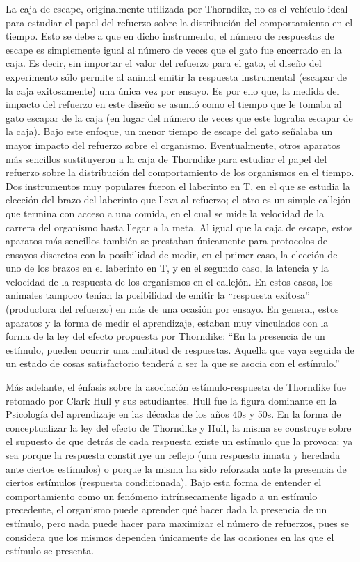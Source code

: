 \documentclass[
  letterpaper,
]{book}
\begin{document}
La caja de escape, originalmente utilizada por Thorndike, no es el
vehículo ideal para estudiar el papel del refuerzo sobre la distribución
del comportamiento en el tiempo. Esto se debe a que en dicho
instrumento, el número de respuestas de escape es simplemente igual al
número de veces que el gato fue encerrado en la caja. Es decir, sin
importar el valor del refuerzo para el gato, el diseño del experimento
sólo permite al animal emitir la respuesta instrumental (escapar de la
caja exitosamente) una única vez por ensayo. Es por ello que, la medida
del impacto del refuerzo en este diseño se asumió como el tiempo que le
tomaba al gato escapar de la caja (en lugar del número de veces que este
lograba escapar de la caja). Bajo este enfoque, un menor tiempo de
escape del gato señalaba un mayor impacto del refuerzo sobre el
organismo. Eventualmente, otros aparatos más sencillos sustituyeron a la
caja de Thorndike para estudiar el papel del refuerzo sobre la
distribución del comportamiento de los organismos en el tiempo. Dos
instrumentos muy populares fueron el laberinto en T, en el que se
estudia la elección del brazo del laberinto que lleva al refuerzo; el
otro es un simple callejón que termina con acceso a una comida, en el
cual se mide la velocidad de la carrera del organismo hasta llegar a la
meta. Al igual que la caja de escape, estos aparatos más sencillos
también se prestaban únicamente para protocolos de ensayos discretos con
la posibilidad de medir, en el primer caso, la elección de uno de los
brazos en el laberinto en T, y en el segundo caso, la latencia y la
velocidad de la respuesta de los organismos en el callejón. En estos
casos, los animales tampoco tenían la posibilidad de emitir la
``respuesta exitosa'' (productora del refuerzo) en más de una ocasión
por ensayo. En general, estos aparatos y la forma de medir el
aprendizaje, estaban muy vinculados con la forma de la ley del efecto
propuesta por Thorndike: ``En la presencia de un estímulo, pueden
ocurrir una multitud de respuestas. Aquella que vaya seguida de un
estado de cosas satisfactorio tenderá a ser la que se asocia con el
estímulo.''

Más adelante, el énfasis sobre la asociación estímulo-respuesta de
Thorndike fue retomado por Clark Hull y sus estudiantes. Hull fue la
figura dominante en la Psicología del aprendizaje en las décadas de los
años 40s y 50s. En la forma de conceptualizar la ley del efecto de
Thorndike y Hull, la misma se construye sobre el supuesto de que detrás
de cada respuesta existe un estímulo que la provoca: ya sea porque la
respuesta constituye un reflejo (una respuesta innata y heredada ante
ciertos estímulos) o porque la misma ha sido reforzada ante la presencia
de ciertos estímulos (respuesta condicionada). Bajo esta forma de
entender el comportamiento como un fenómeno intrínsecamente ligado a un
estímulo precedente, el organismo puede aprender qué hacer dada la
presencia de un estímulo, pero nada puede hacer para maximizar el número
de refuerzos, pues se considera que los mismos dependen únicamente de
las ocasiones en las que el estímulo se presenta.
\end{document}
